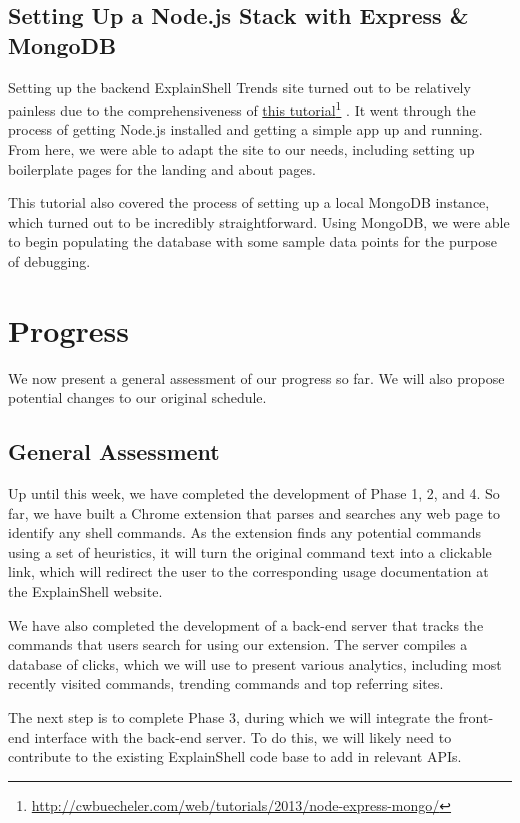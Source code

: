 \documentclass[11pt]{article}
\newcommand\fnurl[2]{%
\href{#1}{#2}\footnote{\url{#1}}%
}
\begin{document}
\subsection{Setting Up a Node.js Stack with Express \& MongoDB}

Setting up the backend ExplainShell Trends site turned out to be relatively
painless due to the comprehensiveness of
\fnurl{http://cwbuecheler.com/web/tutorials/2013/node-express-mongo/}{this
tutorial}. It went through the process of getting Node.js installed and getting
a simple app up and running. From here, we were able to adapt the site to our
needs, including setting up boilerplate pages for the landing and about
pages.

This tutorial also covered the process of setting up a local MongoDB instance,
which turned out to be incredibly straightforward. Using MongoDB, we were able
to begin populating the database with some sample data points for the purpose of
debugging.

\section{Progress}

We now present a general assessment of our progress so far. We will
also propose potential changes to our original schedule.

\subsection{General Assessment}
Up until this week, we have completed the development of Phase 1, 2, and 4.
So far, we have built a Chrome extension that parses and searches any web page
to identify any shell commands. As the extension finds any potential
commands using a set of heuristics, it will turn the original command text
into a clickable link, which will redirect the user to the corresponding
usage documentation at the ExplainShell website.

We have also completed the development of a back-end server that tracks
the commands that users search for using our extension. The server compiles
a database of clicks, which we will use to present various analytics,
including most recently visited commands, trending commands and top referring
sites.

The next step is to complete Phase 3, during which we will integrate the
front-end interface with the back-end server. To do this, we will likely need
to contribute to the existing ExplainShell code base to add in relevant APIs.
\end{document}
